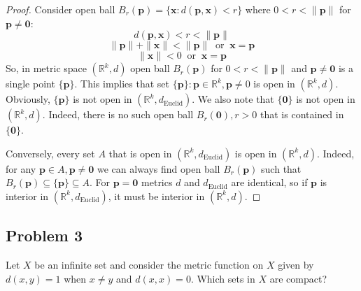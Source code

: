 \documentclass{article}
\begin{document}
\begin{proof}
Consider open ball $B_r(\mathbf{p}) = \{ \mathbf{x} : d(\mathbf{p}, \mathbf{x}) < r \}$ where $0 < r < \|\mathbf{p}\|$ for $\mathbf{p} \neq \mathbf{0}$:
$$ d(\mathbf{p}, \mathbf{x}) < r < \|\mathbf{p}\| $$
$$ \|\mathbf{p}\| + \|\mathbf{x}\| < \|\mathbf{p}\| \> \text{ or } \> \mathbf{x} = \mathbf{p} $$
$$ \|\mathbf{x}\| < 0 \> \text{ or } \> \mathbf{x} = \mathbf{p} $$
So, in metric space $(\mathbb{R}^k, d)$ open ball $B_r(\mathbf{p})$ for $0 < r < \|\mathbf{p}\|$ and $\mathbf{p} \neq \mathbf{0}$ is a single point $\{\mathbf{p}\}$. This implies that set $\{\mathbf{p}\} : \mathbf{p} \in \mathbb{R}^k, \mathbf{p} \neq 0$ is open in $(\mathbb{R}^k, d)$. Obviously, $\{\mathbf{p}\}$ is not open in $(\mathbb{R}^k, d_\text{Euclid})$. We also note that $\{ \mathbf{0} \}$ is not open in $(\mathbb{R}^k, d)$. Indeed, there is no such open ball $B_r(\mathbf{0}), r>0$ that is contained in $\{ \mathbf{0} \}$.

Conversely, every set $A$ that is open in $(\mathbb{R}^k, d_\text{Euclid})$ is open in $(\mathbb{R}^k, d)$. Indeed, for any $\mathbf{p} \in A, \mathbf{p} \neq \mathbf{0}$ we can always find open ball $B_r(\mathbf{p})$ such that $B_r(\mathbf{p}) \subseteq \{ \mathbf{p} \} \subseteq A$. For $\mathbf{p} = \mathbf{0}$ metrics $d$ and $d_\text{Euclid}$ are identical, so if $\mathbf{p}$ is interior in $(\mathbb{R}^k, d_\text{Euclid})$, it must be interior in $(\mathbb{R}^k, d)$.
\end{proof}

\subsection*{Problem 3}

\begin{tcolorbox}
Let $X$ be an infinite set and consider the metric function on $X$ given by $d(x, y) = 1$ when
$x \neq y$ and $d(x, x) = 0$. Which sets in $X$ are compact?
\end{tcolorbox}
\end{document}
